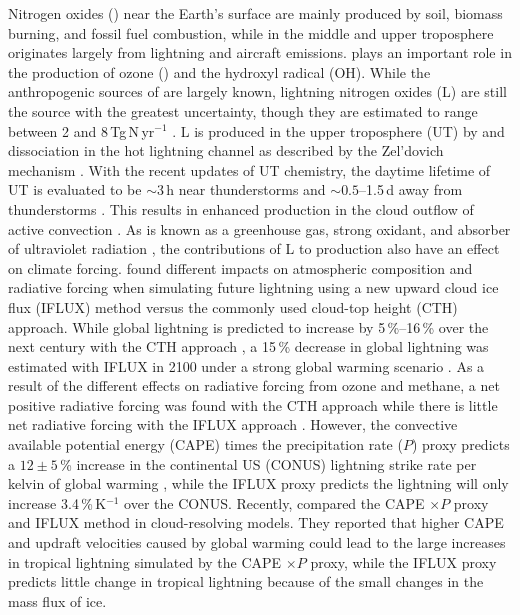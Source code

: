 \documentclass[amt]{copernicus}
\begin{document}
Nitrogen oxides () near the Earth's surface are mainly produced by soil, biomass burning, and fossil fuel combustion, while  in the middle and upper troposphere originates largely from lightning and aircraft emissions.
 plays an important role in the production of ozone () and the hydroxyl radical (OH).
While the anthropogenic sources of  are largely known, lightning nitrogen oxides (L) are still the source with the greatest uncertainty, though they are estimated to range between 2 and
8\,Tg\,N\,yr$^{-1}$ \citep{Schumann.2007}.
L is produced in the upper troposphere (UT) by  and  dissociation in the hot lightning channel as described by the Zel'dovich mechanism \citep{Zeldovich.1967}.
With the recent updates of UT  chemistry, the daytime lifetime of UT  is evaluated to be $\sim 3$\,h near thunderstorms and $\sim 0.5$--1.5\,d away from thunderstorms \citep{Nault.2016,Nault.2017}.
This results in enhanced  production in the cloud outflow of active convection \citep{Pickering.1996,Hauglustaine.2001,DeCaria.2005,Ott.2007,Dobber.2008,Allen.2010,Finney.2016}.
As  is known as a greenhouse gas, strong oxidant, and absorber of ultraviolet radiation \citep{Myhre.2013}, the contributions of L to  production also have an effect on climate forcing.
\citet{Finney.2018} found different impacts on atmospheric composition and radiative forcing when simulating future lightning using a new upward cloud ice flux (IFLUX) method versus the commonly used cloud-top height (CTH) approach.
While global lightning is predicted to increase by 5\,{\%}--16\,{\%} over the next century with the CTH approach \citep{Clark.2017,Banerjee.2014,Krause.2014}, a 15\,{\%} decrease in global lightning was estimated with IFLUX in 2100 under a strong global warming scenario \citep{Finney.2018}.
As a result of the different effects on radiative forcing from ozone and methane, a net positive radiative forcing was found with the CTH approach while there is little net radiative forcing with the IFLUX approach \citep{Finney.2018}.
However, the convective available potential energy (CAPE) times the precipitation rate ($P$) proxy predicts a $12\pm 5$\,{\%} increase in the continental US (CONUS) lightning strike rate per kelvin of global warming \citep{Romps.2014}, while the IFLUX proxy predicts the lightning will only increase 3.4\,{\%}\,K$^{-1}$  over the CONUS.
Recently, \citet{Romps.2019} compared the CAPE $\times P$ proxy and IFLUX method in cloud-resolving models.
They reported that higher CAPE and updraft velocities caused by global warming could lead to the large increases in tropical lightning simulated by the CAPE $\times P$ proxy, while the IFLUX proxy predicts little change in tropical lightning because of the small changes in the mass flux of ice.
\end{document}
